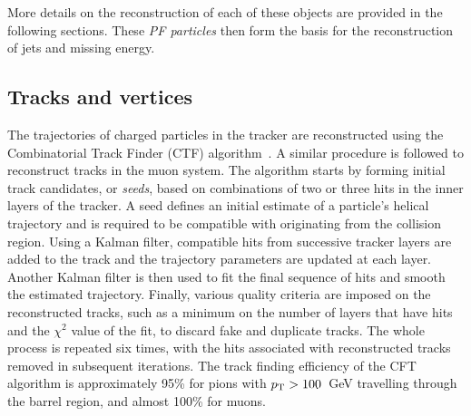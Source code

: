 More details on the reconstruction of each of these objects are provided in the 
following sections. These \textit{PF particles} then form the basis for the 
reconstruction of jets and missing energy.


\subsection{Tracks and vertices}


The trajectories of charged particles in the tracker are reconstructed using 
the Combinatorial Track Finder (CTF) algorithm~\cite{track-vertex}. 
A similar procedure is followed to reconstruct tracks in the muon system.
The algorithm starts by forming initial track candidates, or \textit{seeds}, 
based on 
combinations of two or three hits in the inner layers of the tracker. A seed 
defines an initial estimate of a particle's helical trajectory and is required 
to be compatible with originating from the collision region. Using a Kalman 
filter, compatible hits from successive tracker layers are added to the track 
and the trajectory parameters are updated at each layer. Another Kalman filter 
is then used to fit the final sequence of hits and smooth the estimated 
trajectory. 
Finally, various quality criteria are imposed on the reconstructed 
tracks, such as a minimum on the number of layers that have hits and the 
$\chi^2$ value of the fit, to discard fake and duplicate tracks. The whole 
process is repeated six times, with the hits associated with reconstructed 
tracks removed in subsequent iterations. The track finding efficiency of the 
CFT algorithm is approximately 95\% for pions with ${p_{\text T}}>100$~GeV travelling 
through the barrel region, and almost 100\% for muons.


